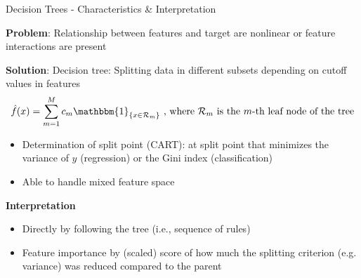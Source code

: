 \documentclass[11pt,compress,t,notes=noshow, aspectratio=169, xcolor=table]{beamer}
\begin{document}

\begin{frame}{Decision Trees - Characteristics \& Interpretation}

\textbf{Problem}: Relationship between features and target are nonlinear or feature interactions are present

\medskip
\textbf{Solution}: Decision tree: Splitting data in different subsets depending on cutoff values in features
$$
\hat f(x) = \sum_{m=1}^M c_m \mathbbm{1}_{\{x \in \mathcal{R}_m\}}\text{ ,  where $\mathcal{R}_m$ is the $m$-th leaf node of the tree}
$$

\begin{itemize}
    \item Determination of split point (CART): at split point that minimizes the variance of $y$ (regression) or the Gini index (classification)
    \item Able to handle mixed feature space
\end{itemize}


\textbf{Interpretation}
\begin{itemize}
    \item Directly by following the tree (i.e., sequence of rules)
    \item Feature importance by (scaled) score of how much the splitting criterion (e.g. variance) was reduced compared to the parent
\end{itemize}



\end{frame}
\end{document}
